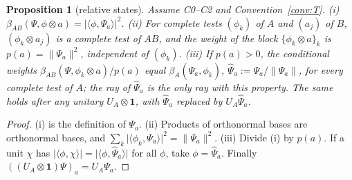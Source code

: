 \documentclass[aps,pra,onecolumn,superscriptaddress,nofootinbib,10pt]{revtex4-2}
\newtheorem{proposition}[theorem]{Proposition}
\theoremstyle{definition}
\theoremstyle{remark}
\newcommand{\ip}[2]{\langle #1,#2\rangle}
\begin{document}
\begin{proposition}[relative states]\label{prop:relative}
Assume C0--C2 and Convention~\ref{conv:T}.
(i) $\beta_{AB}(\Psi,\phi\otimes a)=\lvert\ip{\phi}{\Psi_a}\rvert^2$.
(ii) For complete tests $(\phi_k)$ of $A$ and $(a_j)$ of $B$, $(\phi_k\otimes a_j)$ is a complete test
of $AB$, and the weight of the block $\{\phi_k\otimes a\}_k$ is $p(a)=\lVert\Psi_a\rVert^2$, independent of
$(\phi_k)$.
(iii) If $p(a)>0$, the conditional weights $\beta_{AB}(\Psi,\phi_k\otimes a)/p(a)$ equal
$\beta_A(\hat\Psi_a,\phi_k)$, $\hat\Psi_a:=\Psi_a/\lVert\Psi_a\rVert$, for every complete test of $A$; the
ray of $\hat\Psi_a$ is the only ray with this property.  The same holds after any unitary $U_A\otimes\mathbf1$,
with $\hat\Psi_a$ replaced by $U_A\hat\Psi_a$.
\end{proposition}
\begin{proof}
(i) is the definition of $\Psi_a$.  (ii) Products of orthonormal bases are orthonormal bases, and
$\sum_k\lvert\ip{\phi_k}{\Psi_a}\rvert^2=\lVert\Psi_a\rVert^2$.  (iii) Divide (i) by $p(a)$.  If a unit
$\chi$ has $\lvert\ip{\phi}{\chi}\rvert=\lvert\ip{\phi}{\hat\Psi_a}\rvert$ for all $\phi$, take
$\phi=\hat\Psi_a$.  Finally $((U_A\otimes\mathbf1)\Psi)_a=U_A\Psi_a$.
\end{proof}
\end{document}

